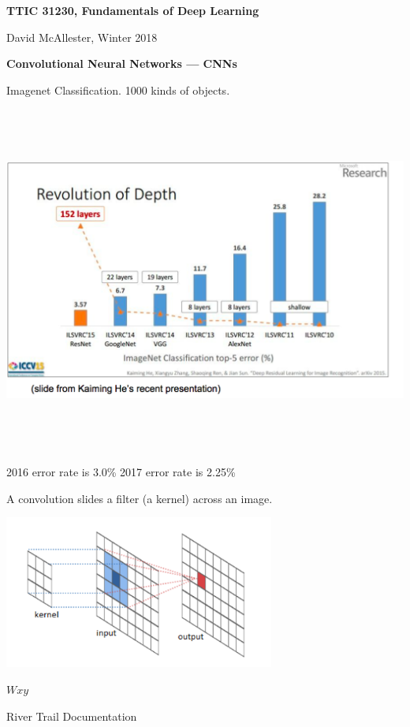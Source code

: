 



{\Huge

  \centerline{\bf TTIC 31230, Fundamentals of Deep Learning}
  \bigskip
  \centerline{David McAllester, Winter 2018}

    \vfill
  \centerline{\bf Convolutional Neural Networks --- CNNs}
  \vfill
  \vfill



Imagenet Classification. 1000 kinds of objects.

\vfill
\centerline{\includegraphics[height=4.5in]{../images/IVLSRC}}
2016 error rate is 3.0\% \hspace{1.0in} 2017 error rate is 2.25\%



A convolution slides a filter (a kernel) across an image.

\centerline{\includegraphics[width = 3.5in]{../images/Convolution}}
\centerline{$W$\hspace{6ex}$x$\hspace{6ex}$y$}
\centerline{\large River Trail Documentation}

}
